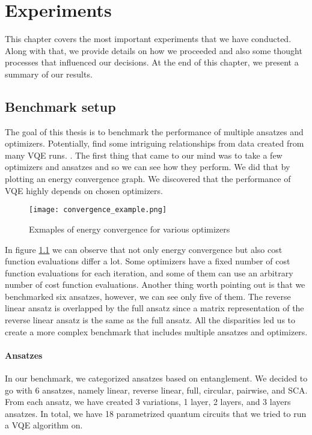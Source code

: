 \chapter{Experiments}\label{ch:experiments}
This chapter covers the most important experiments that we have conducted. Along with that, we provide details on how we proceeded and also some thought processes that influenced our decisions. At the end of this chapter, we present a summary of our results.

\section{Benchmark setup}
The goal of this thesis is to benchmark the performance of multiple ansatzes and optimizers. Potentially, find some intriguing relationships from data created from many VQE runs. . The first thing that came to our mind was to take a few optimizers and ansatzes and so we can see how they perform. We did that by plotting an energy convergence graph. We discovered that the performance of VQE highly depends on chosen optimizers. 

\begin{figure}[H]
    \centering
    \texttt{[image: convergence\_example.png]}
    \caption{Exmaples of energy convergence for various optimizers}
    \label{fig:energy-convergence}
\end{figure}

In figure \ref{fig:energy-convergence} we can observe that not only energy convergence but also cost function evaluations differ a lot. Some optimizers have a fixed number of cost function evaluations for each iteration, and some of them can use an arbitrary number of cost function evaluations.  Another thing worth pointing out is that we benchmarked six ansatzes, however, we can see only five of them. The reverse linear ansatz is overlapped by the full ansatz since a matrix representation of the reverse linear ansatz is the same as the full ansatz. All the disparities led us to create a more complex benchmark that includes multiple ansatzes and optimizers.

\subsubsection{Ansatzes}
In our benchmark, we categorized ansatzes based on entanglement. We decided to go with 6 ansatzes, namely linear, reverse linear, full, circular, pairwise, and SCA. From each ansatz, we have created 3 variations, 1 layer, 2 layers, and 3 layers ansatzes. In total, we have 18 parametrized quantum circuits that we tried to run a VQE algorithm on.

